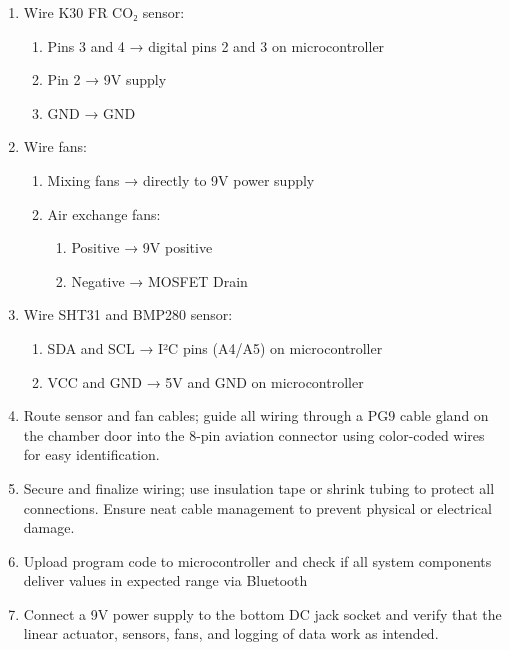 \documentclass[
  11pt,
  letterpaper,
]{book}
\providecommand{\tightlist}{%
  \setlength{\itemsep}{0pt}\setlength{\parskip}{0pt}}
\begin{document}
\begin{enumerate}
  \begin{enumerate}
  \def\labelenumii{\alph{enumii}.}
  \tightlist
  \item
    Air exchange fans: behind sliding door (facing opposite
    directions)\\
  \item
    Mixing fans: top and bottom of chamber door
  \end{enumerate}
\item
  Wire K30 FR CO₂ sensor:

  \begin{enumerate}
  \def\labelenumii{\alph{enumii}.}
  \tightlist
  \item
    Pins 3 and 4 → digital pins 2 and 3 on microcontroller\\
  \item
    Pin 2 → 9V supply\\
  \item
    GND → GND
  \end{enumerate}
\item
  Wire fans:

  \begin{enumerate}
  \def\labelenumii{\alph{enumii}.}
  \tightlist
  \item
    Mixing fans → directly to 9V power supply\\
  \item
    Air exchange fans:

    \begin{enumerate}
    \def\labelenumiii{\roman{enumiii}.}
    \tightlist
    \item
      Positive → 9V positive\\
    \item
      Negative → MOSFET Drain
    \end{enumerate}
  \end{enumerate}
\item
  Wire SHT31 and BMP280 sensor:

  \begin{enumerate}
  \def\labelenumii{\alph{enumii}.}
  \tightlist
  \item
    SDA and SCL → I²C pins (A4/A5) on microcontroller\\
  \item
    VCC and GND → 5V and GND on microcontroller
  \end{enumerate}
\item
  Route sensor and fan cables; guide all wiring through a PG9 cable
  gland on the chamber door into the 8-pin aviation connector using
  color-coded wires for easy identification.
\item
  Secure and finalize wiring; use insulation tape or shrink tubing to
  protect all connections. Ensure neat cable management to prevent
  physical or electrical damage.
\item
  Upload program code to microcontroller and check if all system
  components deliver values in expected range via Bluetooth
\item
  Connect a 9V power supply to the bottom DC jack socket and verify that
  the linear actuator, sensors, fans, and logging of data work as
  intended.
\end{enumerate}
\end{document}
